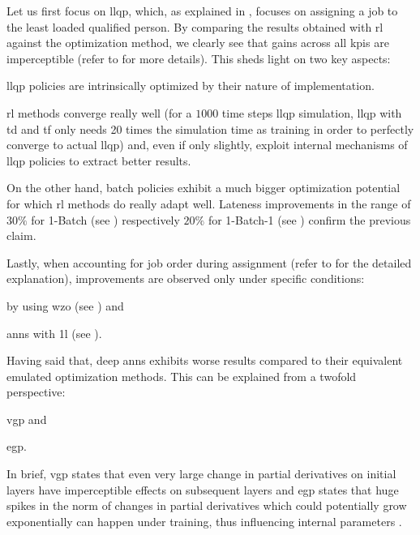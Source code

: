 \documentclass{seal_thesis}
\begin{document}
Let us first focus on \gls{llqp}, which, as explained in , focuses on assigning a job to the least loaded qualified person. By comparing the results obtained with \gls{rl} against the optimization method, we clearly see that gains across all \glspl{kpi} are imperceptible (refer to  for more details). This sheds light on two key aspects:
\begin{enumerate*}
	\item \gls{llqp} policies are intrinsically optimized by their nature of implementation.
	\item \gls{rl} methods converge really well (for a $1000$ time steps \gls{llqp} simulation, \gls{llqp} with \gls{td} and \gls{tf} only needs 20 times the simulation time as training in order to perfectly converge to actual \gls{llqp}) and, even if only slightly, exploit internal mechanisms of \gls{llqp} policies to extract better results.
\end{enumerate*}

On the other hand, batch policies exhibit a much bigger optimization potential for which \gls{rl} methods do really adapt well. Lateness improvements in the range of $30\%$ for 1-Batch (see ) respectively $20\%$ for 1-Batch-1 (see ) confirm the previous claim.

Lastly, when accounting for job order during assignment (refer to  for the detailed explanation), improvements are observed only under specific conditions:
\begin{enumerate*}
	\item by using \gls{wzo} (see ) and 
	\item \glspl{ann} with \gls{1l} (see ).
\end{enumerate*}

Having said that, deep \glspl{ann} exhibits worse results compared to their equivalent emulated optimization methods. This can be explained from a twofold perspective:
\begin{enumerate*}
	\item \gls{vgp} and
	\item \gls{egp}.
\end{enumerate*}

In brief, \gls{vgp} states that even very large change in partial derivatives on initial layers have imperceptible effects on subsequent layers \cite{Bengio1994} and \gls{egp} states that huge spikes in the norm of changes in partial derivatives which could potentially grow exponentially can happen under training, thus influencing internal parameters \cite{Bengio1994,Pascanu2012}.
\end{document}
